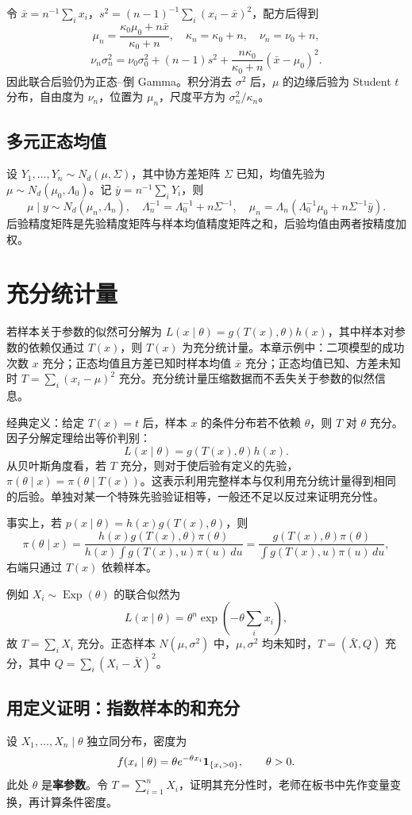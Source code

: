 令 $\bar x=n^{-1}\sum_i x_i$，$s^2=(n-1)^{-1}\sum_i(x_i-\bar x)^2$，配方后得到
\[
\mu_n=\frac{\kappa_0\mu_0+n\bar x}{\kappa_0+n},\quad
\kappa_n=\kappa_0+n,\quad \nu_n=\nu_0+n,
\]
\[
\nu_n\sigma_n^2=\nu_0\sigma_0^2+(n-1)s^2+
\frac{n\kappa_0}{\kappa_0+n}(\bar x-\mu_0)^2.
\]
因此联合后验仍为正态--倒 Gamma。积分消去 $\sigma^2$ 后，$\mu$ 的边缘后验为 Student $t$ 分布，自由度为 $\nu_n$，位置为 $\mu_n$，尺度平方为 $\sigma_n^2/\kappa_n$。

\subsection{多元正态均值}
设 $Y_1,\ldots,Y_n\sim N_d(\mu,\Sigma)$，其中协方差矩阵 $\Sigma$ 已知，均值先验为 $\mu\sim N_d(\mu_0,\Lambda_0)$。记 $\bar y=n^{-1}\sum_iY_i$，则
\[
\mu\mid y\sim N_d(\mu_n,\Lambda_n),\quad
\Lambda_n^{-1}=\Lambda_0^{-1}+n\Sigma^{-1},\quad
\mu_n=\Lambda_n(\Lambda_0^{-1}\mu_0+n\Sigma^{-1}\bar y).
\]
后验精度矩阵是先验精度矩阵与样本均值精度矩阵之和，后验均值由两者按精度加权。

\section{充分统计量}
若样本关于参数的似然可分解为 $L(x\mid\theta)=g(T(x),\theta)h(x)$，其中样本对参数的依赖仅通过 $T(x)$，则 $T(x)$ 为充分统计量。本章示例中：二项模型的成功次数 $x$ 充分；正态均值且方差已知时样本均值 $\bar x$ 充分；正态均值已知、方差未知时 $T=\sum_i(x_i-\mu)^2$ 充分。充分统计量压缩数据而不丢失关于参数的似然信息。

经典定义：给定 $T(x)=t$ 后，样本 $x$ 的条件分布若不依赖 $\theta$，则 $T$ 对 $\theta$ 充分。因子分解定理给出等价判别：
\[
L(x\mid\theta)=g(T(x),\theta)h(x).
\]
从贝叶斯角度看，若 $T$ 充分，则对于使后验有定义的先验，$\pi(\theta\mid x)=\pi(\theta\mid T(x))$。这表示利用完整样本与仅利用充分统计量得到相同的后验。单独对某一个特殊先验验证相等，一般还不足以反过来证明充分性。

事实上，若 $p(x\mid\theta)=h(x)g(T(x),\theta)$，则
\[
\pi(\theta\mid x)
=\frac{h(x)g(T(x),\theta)\pi(\theta)}{h(x)\int g(T(x),u)\pi(u)\,du}
=\frac{g(T(x),\theta)\pi(\theta)}{\int g(T(x),u)\pi(u)\,du},
\]
右端只通过 $T(x)$ 依赖样本。

例如 $X_i\sim\operatorname{Exp}(\theta)$ 的联合似然为
\[
L(x\mid\theta)=\theta^n\exp\left(-\theta\sum_i x_i\right),
\]
故 $T=\sum_iX_i$ 充分。正态样本 $N(\mu,\sigma^2)$ 中，$\mu,\sigma^2$ 均未知时，$T=(\bar X,Q)$ 充分，其中 $Q=\sum_i(X_i-\bar X)^2$。


\subsection{用定义证明：指数样本的和充分}
设 $X_1,\ldots,X_n\mid\theta$ 独立同分布，密度为
\[
f(x_i\mid\theta)=\theta e^{-\theta x_i}\mathbf{1}_{\{x_i>0\}},\qquad\theta>0.
\]
此处 $\theta$ 是\textbf{率参数}。令 $T=\sum_{i=1}^nX_i$，证明其充分性时，老师在板书中先作变量变换，再计算条件密度。


